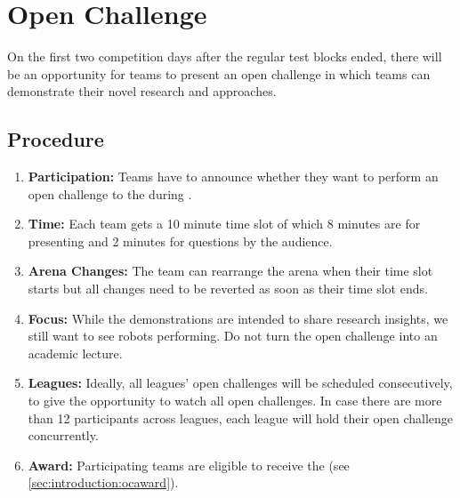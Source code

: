 \section{Open Challenge}
\label{sec:rules:openchallenge}

On the first two competition days after the regular test blocks ended, there will be an opportunity for teams to present an open challenge in which teams can demonstrate their novel research and approaches.

\subsection{Procedure}
\label{sec:rules:ocprocedure}
\begin{enumerate}
	\item \textbf{Participation:} Teams have to announce whether they want to perform an open challenge to the  during \SetupDays{}.
	\item \textbf{Time:} Each team gets a 10 minute time slot of which 8 minutes are for presenting and 2 minutes for questions by the audience.
	\item \textbf{Arena Changes:} The team can rearrange the arena when their time slot starts but all changes need to be reverted as soon as their time slot ends.
	\item \textbf{Focus:} While the demonstrations are intended to share research insights, we still want to see robots performing. Do not turn the open challenge into an academic lecture.
	\item \textbf{Leagues:} Ideally, all \AtHome{} leagues' open challenges will be scheduled consecutively, to give the opportunity to watch all open challenges. In case there are more than 12 participants across leagues, each league will hold their open challenge concurrently.
	\item \textbf{Award:} Participating teams are eligible to receive the \OCAward{} (see \ref{sec:introduction:ocaward}).
\end{enumerate}

